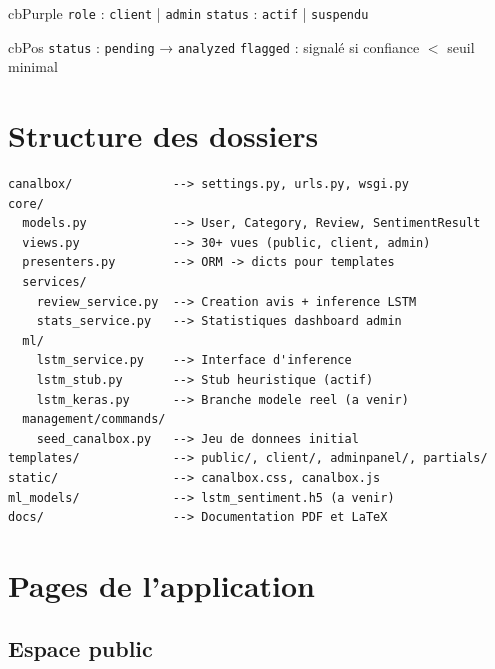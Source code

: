 \documentclass[11pt,a4paper]{article}
\begin{document}
\begin{archbox}[User]{cbPurple}
  \texttt{role} : \texttt{client} | \texttt{admin} \quad
  \texttt{status} : \texttt{actif} | \texttt{suspendu}
\end{archbox}

\begin{archbox}{cbPos}
  \texttt{status} : \texttt{pending} → \texttt{analyzed} \quad
  \texttt{flagged} : signalé si confiance $<$ seuil minimal
\end{archbox}

\section{Structure des dossiers}

\begin{lstlisting}
canalbox/              --> settings.py, urls.py, wsgi.py
core/
  models.py            --> User, Category, Review, SentimentResult
  views.py             --> 30+ vues (public, client, admin)
  presenters.py        --> ORM -> dicts pour templates
  services/
    review_service.py  --> Creation avis + inference LSTM
    stats_service.py   --> Statistiques dashboard admin
  ml/
    lstm_service.py    --> Interface d'inference
    lstm_stub.py       --> Stub heuristique (actif)
    lstm_keras.py      --> Branche modele reel (a venir)
  management/commands/
    seed_canalbox.py   --> Jeu de donnees initial
templates/             --> public/, client/, adminpanel/, partials/
static/                --> canalbox.css, canalbox.js
ml_models/             --> lstm_sentiment.h5 (a venir)
docs/                  --> Documentation PDF et LaTeX
\end{lstlisting}

\section{Pages de l'application}

\subsection{Espace public}
\end{document}
